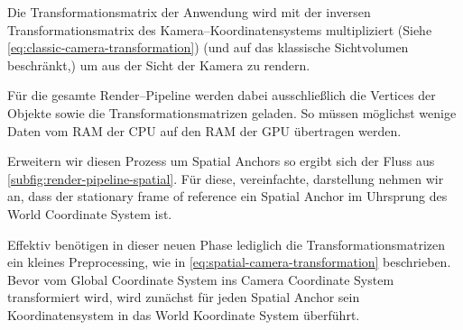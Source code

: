     Die Transformationsmatrix der Anwendung wird mit der inversen Transformationsmatrix des Kamera--Koordinatensystems multipliziert (Siehe \autoref{eq:classic-camera-transformation}) (und auf das klassische Sichtvolumen beschränkt,) um aus der Sicht der Kamera zu rendern.

    Für die gesamte Render--Pipeline werden dabei ausschließlich die Vertices der Objekte sowie die Transformationsmatrizen geladen.
    So müssen möglichst wenige Daten vom RAM der CPU auf den RAM der GPU übertragen werden.

    Erweitern wir diesen Prozess um Spatial Anchors so ergibt sich der Fluss aus \autoref{subfig:render-pipeline-spatial}.
    Für diese, vereinfachte, darstellung nehmen wir an, dass der stationary frame of reference ein Spatial Anchor im Uhrsprung des World Coordinate System ist.

    Effektiv benötigen in dieser neuen Phase lediglich die Transformationsmatrizen ein kleines Preprocessing, wie in \autoref{eq:spatial-camera-transformation} beschrieben.
    Bevor vom Global Coordinate System ins Camera Coordinate System transformiert wird, wird zunächst für jeden Spatial Anchor sein Koordinatensystem in das World Koordinate System überführt.

